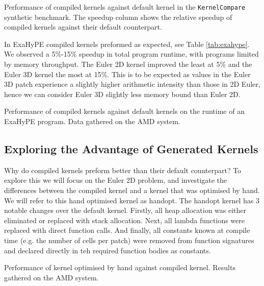 \begin{table}
    \centering
 
\caption{Performance of compiled kernels against default kernel in the \texttt{KernelCompare} synthetic benchmark. The speedup column shows the relative speedup of compiled kernels against their default counterpart.}\label{tab:kernel_comapre} 
\end{table}

In ExaHyPE compiled kernels preformed as expected, see Table \ref{tab:exahype}.
We observed a 5\%-15\% speedup in total program runtime, with programs limited by memory throughput.
The Euler 2D kernel improved the least at 5\% and the Euler 3D kernel the most at 15\%.
This is to be expected as values in the Euler 3D patch experience a slightly higher arithmetic intensity than those in 2D Euler, hence we can consider Euler 3D slightly less memory bound than Euler 2D.
 
\begin{table}
    \centering
 
\caption{Performance of compiled kernels against default kernels on the runtime of an ExaHyPE program. Data gathered on the AMD system.}\label{tab:exahype} 
\end{table}

\subsection{Exploring the Advantage of Generated Kernels}

Why do compiled kernels preform better than their default counterpart?
To explore this we will focus on the Euler 2D problem, and investigate the differences between the compiled kernel and a kernel that was optimised by hand.
We will refer to this hand optimised kernel as handopt.
The handopt kernel has 3 notable changes over the default kernel.
Firstly, all heap allocation was either eliminated or replaced with stack allocation.
Next, all lambda functions were replaced with direct function calls.
And finally, all constants known at compile time (e.g. the number of cells per patch) were removed from function signatures and declared directly in teh required function bodies as constants.


\begin{table}
    \centering
     
    \caption{Performance of kernel optimised by hand against compiled kernel. Results gathered on the AMD system.}\label{tab:hand_v_compiled}
\end{table}

